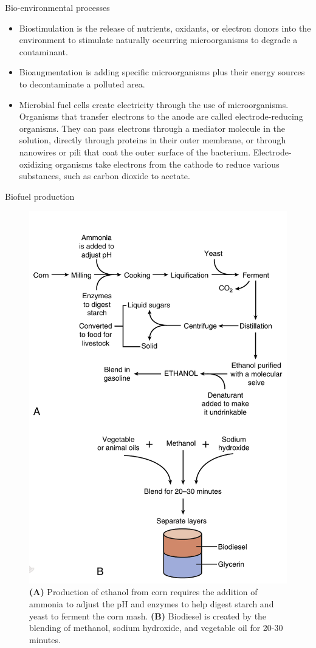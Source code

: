 \documentclass[ignorenonframetext,aspectratio=169]{beamer}
\providecommand{\tightlist}{%
  \setlength{\itemsep}{0pt}\setlength{\parskip}{0pt}}
\begin{document}
\begin{frame}{Bio-environmental processes}
\protect\hypertarget{bio-environmental-processes-1}{}

\begin{itemize}
\tightlist
\item
  \alert{Biostimulation} is the release of nutrients, oxidants, or
  electron donors into the environment to stimulate naturally occurring
  microorganisms to degrade a contaminant.
\item
  \alert{Bioaugmentation} is adding specific microorganisms plus their
  energy sources to decontaminate a polluted area.
\item
  \alert{Microbial fuel cells} create electricity through the use of
  microorganisms. Organisms that transfer electrons to the anode are
  called electrode-reducing organisms. They can pass electrons through a
  mediator molecule in the solution, directly through proteins in their
  outer membrane, or through nanowires or pili that coat the outer
  surface of the bacterium. Electrode-oxidizing organisms take electrons
  from the cathode to reduce various substances, such as carbon dioxide
  to acetate.
\end{itemize}

\end{frame}

\begin{frame}{Biofuel production}
\protect\hypertarget{biofuel-production}{}

\begin{figure}
\includegraphics[width=0.28\linewidth]{../images/biofuel_production} \caption{\textbf{(A)} Production of ethanol from corn requires the addition of ammonia to adjust the pH and enzymes to help digest starch and yeast to ferment the corn mash. \textbf{(B)} Biodiesel is created by the blending of methanol, sodium hydroxide, and vegetable oil for 20-30 minutes.}\label{fig:biofuel-production}
\end{figure}

\end{frame}
\end{document}
